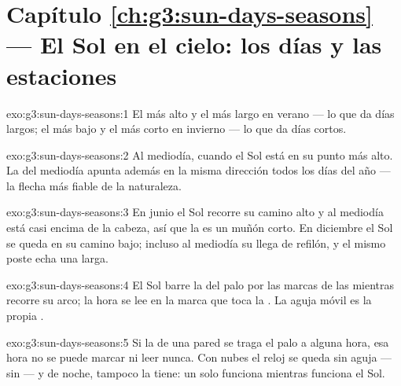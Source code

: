\section*{Capítulo \ref{ch:g3:sun-days-seasons} --- El Sol en el cielo: los días y las estaciones}

\begin{solution}{exo:g3:sun-days-seasons:1}
El más alto y el más largo en verano --- lo que da días largos; el más
bajo y el más corto en invierno --- lo que da días cortos.
\end{solution}

\begin{solution}{exo:g3:sun-days-seasons:2}
Al mediodía, cuando el Sol está en su punto más alto. La  del
mediodía apunta además en la misma dirección todos los días del año
--- la flecha más fiable de la naturaleza.
\end{solution}

\begin{solution}{exo:g3:sun-days-seasons:3}
En junio el Sol recorre su camino alto y al mediodía está casi encima
de la cabeza, así que la  es un muñón corto. En diciembre el
Sol se queda en su camino bajo; incluso al mediodía su  llega de
refilón, y el mismo poste echa una  larga.
\end{solution}

\begin{solution}{exo:g3:sun-days-seasons:4}
El Sol barre la  del palo por las marcas de las  mientras
recorre su arco; la hora se lee en la marca que toca la . La
aguja móvil es la propia .
\end{solution}

\begin{solution}{exo:g3:sun-days-seasons:5}
Si la  de una pared se traga el palo a alguna hora, esa hora no
se puede marcar ni leer nunca. Con nubes el reloj se queda sin aguja
--- sin  --- y de noche, tampoco la tiene: un 
solo funciona mientras funciona el Sol.
\end{solution}

